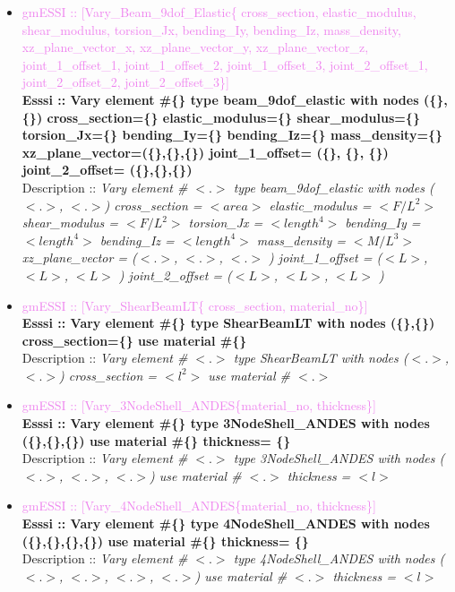 \documentclass[11pt]{article}
\begin{document}
\begin{itemize}
  \item \textcolor{violet}{gmESSI :: [Vary\_Beam\_9dof\_Elastic\{ cross\_section, elastic\_modulus, shear\_modulus, torsion\_Jx, bending\_Iy, bending\_Iz, mass\_density, xz\_plane\_vector\_x, xz\_plane\_vector\_y, xz\_plane\_vector\_z, joint\_1\_offset\_1, joint\_1\_offset\_2, joint\_1\_offset\_3, joint\_2\_offset\_1, joint\_2\_offset\_2, joint\_2\_offset\_3\}]} \\
  \textbf{Esssi :: Vary element \#\{\} type beam\_9dof\_elastic with nodes (\{\},\{\}) cross\_section=\{\} elastic\_modulus=\{\} shear\_modulus=\{\} torsion\_Jx=\{\} bending\_Iy=\{\} bending\_Iz=\{\} mass\_density=\{\}  xz\_plane\_vector=(\{\},\{\},\{\}) joint\_1\_offset= (\{\}, \{\}, \{\}) joint\_2\_offset= (\{\},\{\},\{\})}\\
  Description :: \textit{ Vary element \# $<.>$ type beam\_9dof\_elastic with nodes ($<.>$, $<.>$) cross\_section = $<area>$ elastic\_modulus = $<F/L^2>$ shear\_modulus = $<F/L^2>$ torsion\_Jx = $<length^4>$ bending\_Iy = $<length^4>$ bending\_Iz = $<length^4>$ mass\_density = $<M/L^3>$  xz\_plane\_vector = ($<.>$, $<.>$, $<.>$ ) joint\_1\_offset = ($<L>$, $<L>$, $<L>$ ) joint\_2\_offset = ($<L>$, $<L>$, $<L>$ )}

  \item \textcolor{violet}{gmESSI :: [Vary\_ShearBeamLT\{ cross\_section, material\_no\}]} \\             
  \textbf{Esssi :: Vary element \#\{\} type ShearBeamLT with nodes (\{\},\{\}) cross_section=\{\} use material \#\{\}}\\
  Description :: \textit{ Vary element \# $<.>$ type ShearBeamLT with nodes ($<.>$, $<.>$) cross\_section = $<l^2>$ use material \# $<.>$}

  \item \textcolor{violet}{gmESSI :: [Vary\_3NodeShell\_ANDES\{material\_no, thickness\}]} \\             
  \textbf{Esssi :: Vary element \#\{\} type 3NodeShell\_ANDES with nodes (\{\},\{\},\{\}) use material \#\{\} thickness= \{\}}\\
  Description :: \textit{ Vary element \# $<.>$ type 3NodeShell\_ANDES with nodes ($<.>$, $<.>$, $<.>$) use material \# $<.>$ thickness = $<l>$ }

  \item \textcolor{violet}{gmESSI :: [Vary\_4NodeShell\_ANDES\{material\_no, thickness\}]} \\             
  \textbf{Esssi :: Vary element \#\{\} type 4NodeShell\_ANDES with nodes (\{\},\{\},\{\},\{\}) use material \#\{\} thickness= \{\}}\\
  Description :: \textit{ Vary element \# $<.>$ type 4NodeShell\_ANDES with nodes ($<.>$, $<.>$, $<.>$, $<.>$) use material \# $<.>$ thickness = $<l>$ }


\end{itemize}
\end{document}
